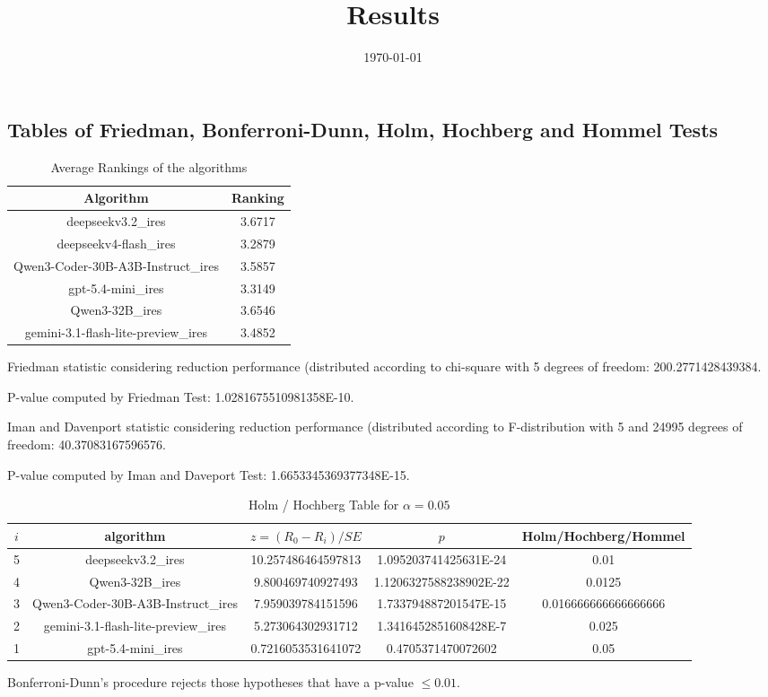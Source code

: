 \documentclass[a4paper,10pt]{article}
\title{Results}
\date{\today}
\begin{document}
\begin{landscape}
\oddsidemargin 0in \topmargin 0in\maketitle
\section{Tables of Friedman, Bonferroni-Dunn, Holm, Hochberg and Hommel Tests}
\begin{table}[!htp]
\centering
\caption{Average Rankings of the algorithms
}\begin{tabular}{c|c}
Algorithm&Ranking\\
\hline
deepseekv3.2_ires&3.6717\\
deepseekv4-flash_ires&3.2879\\
Qwen3-Coder-30B-A3B-Instruct_ires&3.5857\\
gpt-5.4-mini_ires&3.3149\\
Qwen3-32B_ires&3.6546\\
gemini-3.1-flash-lite-preview_ires&3.4852\\
\end{tabular}
\end{table}


Friedman statistic considering reduction performance (distributed according to chi-square with 5 degrees of freedom: 200.2771428439384.


P-value computed by Friedman Test: 1.0281675510981358E-10.\newline

Iman and Davenport statistic considering reduction performance (distributed according to F-distribution with 5 and 24995 degrees of freedom: 40.37083167596576.


P-value computed by Iman and Daveport Test: 1.6653345369377348E-15.\newline

\begin{table}[!htp]
\centering\tiny
\caption{Holm / Hochberg Table for $\alpha=0.05$}
\begin{tabular}{ccccc}
$i$&algorithm&$z=(R_0 - R_i)/SE$&$p$&Holm/Hochberg/Hommel\\
\hline
5&deepseekv3.2_ires&10.257486464597813&1.095203741425631E-24&0.01\\
4&Qwen3-32B_ires&9.800469740927493&1.1206327588238902E-22&0.0125\\
3&Qwen3-Coder-30B-A3B-Instruct_ires&7.959039784151596&1.733794887201547E-15&0.016666666666666666\\
2&gemini-3.1-flash-lite-preview_ires&5.273064302931712&1.3416452851608428E-7&0.025\\
1&gpt-5.4-mini_ires&0.7216053531641072&0.4705371470072602&0.05\\
\hline
\end{tabular}
\end{table}
Bonferroni-Dunn's procedure rejects those hypotheses that have a p-value $\le0.01$.



\end{landscape}
\end{document}
